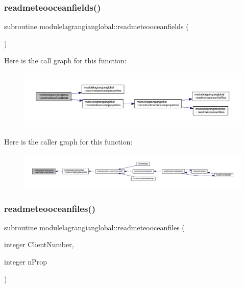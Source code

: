 \subsubsection{\texorpdfstring{readmeteooceanfields()}{readmeteooceanfields()}}
{\footnotesize\ttfamily subroutine modulelagrangianglobal\+::readmeteooceanfields (\begin{DoxyParamCaption}{ }\end{DoxyParamCaption})\hspace{0.3cm}{\ttfamily [private]}}

Here is the call graph for this function\+:\nopagebreak
\begin{figure}[H]
\begin{center}
\leavevmode
\includegraphics[width=350pt]{namespacemodulelagrangianglobal_ab2f7aa5d633698c89eab11bcf4c90928_cgraph}
\end{center}
\end{figure}
Here is the caller graph for this function\+:\nopagebreak
\begin{figure}[H]
\begin{center}
\leavevmode
\includegraphics[width=350pt]{namespacemodulelagrangianglobal_ab2f7aa5d633698c89eab11bcf4c90928_icgraph}
\end{center}
\end{figure}
\mbox{\label{namespacemodulelagrangianglobal_aa7411b9f44061b325d38671fe7aefded}} 
\subsubsection{\texorpdfstring{readmeteooceanfiles()}{readmeteooceanfiles()}}
{\footnotesize\ttfamily subroutine modulelagrangianglobal\+::readmeteooceanfiles (\begin{DoxyParamCaption}\item[{integer}]{Client\+Number,  }\item[{integer}]{n\+Prop }\end{DoxyParamCaption})\hspace{0.3cm}{\ttfamily [private]}}

